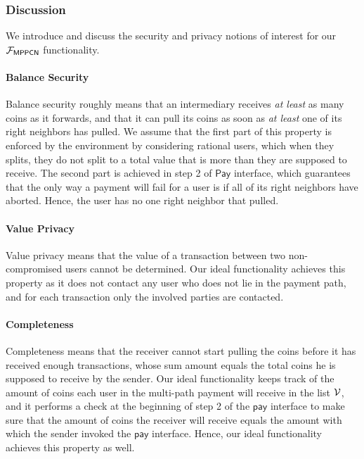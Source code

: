\subsubsection{Discussion}
\label{sec:mppcn-discussion}

We introduce and discuss the security and privacy notions of interest for our 
$\mathcal{F}_{\mathsf{MPPCN}}$ functionality.

\paragraph{Balance Security}
Balance security roughly means that an intermediary receives \emph{at least} as many coins as 
it forwards, and that it can pull its coins as soon as \emph{at least} one of its right 
neighbors has pulled. We assume that the first part of this property is enforced by the 
environment by considering rational users, which when they splits, they do not split to a 
total value that is more than they are supposed to receive.  The second part is achieved in step 2 of 
$\mathsf{Pay}$ interface, which guarantees that the only way a payment will fail 
for a user is if all of its right neighbors have aborted. Hence, the user has no one right 
neighbor that pulled.

\paragraph{Value Privacy}
Value privacy means that the value of a transaction between two non-compromised users cannot 
be determined. Our ideal functionality achieves this property as it does not contact any user 
who does not lie in the payment path, and for each transaction only the involved parties are 
contacted. 


\paragraph{Completeness}
Completeness means that the receiver cannot start pulling the coins before it has received 
enough transactions, whose sum amount equals the total coins he is supposed to receive by 
the sender. Our ideal functionality keeps track of the amount of coins each user in the 
multi-path payment will receive in the list $\mathcal{V}$, and it performs a check at the beginning of 
step 2 of the $\mathsf{pay}$ interface to make sure that the amount of coins the receiver will 
receive equals the amount with which the sender invoked the $\mathsf{pay}$ interface. Hence, our 
ideal functionality achieves this property as well.

